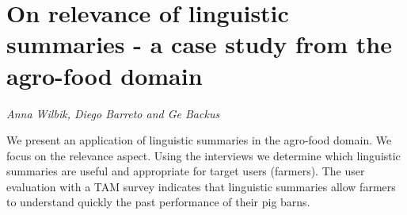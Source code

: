 \documentclass[../booklet.tex]{subfiles}
\begin{document}
\section[On relevance of linguistic summaries - a case study from the agro-food domain. {\it Anna Wilbik, Diego Barreto and Ge Backus}]{On relevance of linguistic summaries - a case study from the agro-food domain}
  

\begin{center}
  {\it Anna Wilbik, Diego Barreto and Ge Backus}
\end{center}

\vskip 0.8cm


We present an application of linguistic summaries in the agro-food domain. We focus on the relevance aspect. Using the interviews we  determine which linguistic summaries are useful and appropriate for target users (farmers). The user evaluation with a TAM survey indicates that linguistic summaries allow farmers to understand quickly the past performance of their pig barns.

\end{document}

